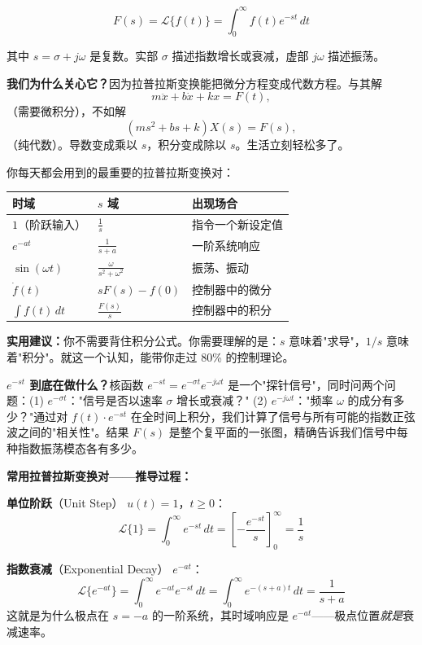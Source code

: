 \documentclass[UTF8]{ctexart}
\begin{document}
\begin{equation}
F(s) = \mathcal{L}\{f(t)\} = \int_0^{\infty} f(t) e^{-st} \, dt
\end{equation}

其中 $s = \sigma + j\omega$ 是复数。实部 $\sigma$ 描述指数增长或衰减，虚部 $j\omega$ 描述振荡。

\textbf{我们为什么关心它？}因为拉普拉斯变换能把微分方程变成代数方程。与其解
\[
m\ddot{x} + b\dot{x} + kx = F(t),
\]
（需要微积分），不如解
\[
(ms^2 + bs + k)X(s) = F(s),
\]
（纯代数）。导数变成乘以 $s$，积分变成除以 $s$。生活立刻轻松多了。

你每天都会用到的最重要的拉普拉斯变换对：

\begin{center}
\begin{tabular}{lll}
\toprule
\textbf{时域} & \textbf{$s$ 域} & \textbf{出现场合} \\
\midrule
$1$（阶跃输入） & $\frac{1}{s}$ & 指令一个新设定值 \\
$e^{-at}$ & $\frac{1}{s+a}$ & 一阶系统响应 \\
$\sin(\omega t)$ & $\frac{\omega}{s^2 + \omega^2}$ & 振荡、振动 \\
$\dot{f}(t)$ & $sF(s) - f(0)$ & 控制器中的微分 \\
$\int f(t)\,dt$ & $\frac{F(s)}{s}$ & 控制器中的积分 \\
\bottomrule
\end{tabular}
\end{center}

\textbf{实用建议：}你不需要背住积分公式。你需要理解的是：$s$ 意味着"求导"，$1/s$ 意味着"积分"。就这一个认知，能带你走过 80\% 的控制理论。

\textbf{$e^{-st}$ 到底在做什么？}核函数 $e^{-st} = e^{-\sigma t} e^{-j\omega t}$ 是一个"探针信号"，同时问两个问题：(1) $e^{-\sigma t}$："信号是否以速率 $\sigma$ 增长或衰减？" (2) $e^{-j\omega t}$："频率 $\omega$ 的成分有多少？"通过对 $f(t) \cdot e^{-st}$ 在全时间上积分，我们计算了信号与所有可能的指数正弦波之间的"相关性"。结果 $F(s)$ 是整个复平面的一张图，精确告诉我们信号中每种指数振荡模态各有多少。

\textbf{常用拉普拉斯变换对——推导过程：}

\textbf{单位阶跃}（Unit Step） $u(t) = 1$，$t \geq 0$：
\[
\mathcal{L}\{1\} = \int_0^{\infty} e^{-st} \, dt = \left[-\frac{e^{-st}}{s}\right]_0^{\infty} = \frac{1}{s}
\]

\textbf{指数衰减}（Exponential Decay） $e^{-at}$：
\[
\mathcal{L}\{e^{-at}\} = \int_0^{\infty} e^{-at} e^{-st} \, dt = \int_0^{\infty} e^{-(s+a)t} \, dt = \frac{1}{s+a}
\]
这就是为什么极点在 $s = -a$ 的一阶系统，其时域响应是 $e^{-at}$——极点位置\textit{就是}衰减速率。
\end{document}
